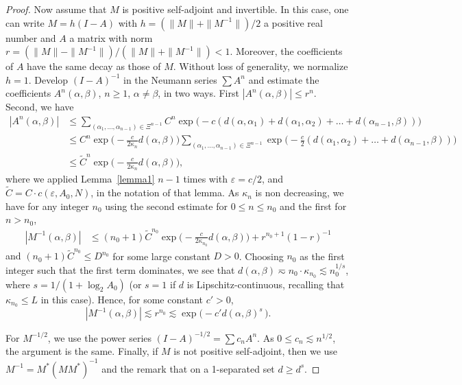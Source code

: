 \documentclass{amsart}
\numberwithin{equation}{section}
\theoremstyle{plain}
\theoremstyle{definition}
\theoremstyle{remark}
\begin{document}
{{\begin{proof}
Now assume that $M$ is {positive} self-adjoint and invertible. In this case, one can write $M=h(I-A)$ with $h=(\|M\| + \|M^{-1}\|)/2$ a positive real number and $A$ a matrix with norm $r=(\|M\|- \|M^{-1}\|)/(\|M\| + \|M^{-1}\|)<1$. Moreover, the coefficients of $A$ have the same decay as those of $M$. Without loss of generality, we normalize $h=1$.  Develop 
$
(I-A)^{-1}$ in the Neumann series $\sum A^n$ and estimate the coefficients $A^n(\alpha,\beta)$, $n\ge 1$, $\alpha\ne \beta$, in two ways. First 
$|A^n(\alpha,\beta)|\le r^n$. Second, we have {
\begin{equation*}
\begin{split}
  |A^n(\alpha,\beta)|
  &\leq \sum_{(\alpha_{1}, \ldots, \alpha_{n-1})\in \Xi^{n-1}} C^n \exp \big(-c (d(\alpha,\alpha_{1})+ d(\alpha_{1},\alpha_{2})+ \ldots +d(\alpha_{n-1},\beta))\big) \\ 
  &\leq C^n\exp\big(-\frac{c}{2\kappa_n}d(\alpha,\beta)\big)\sum_{(\alpha_{1}, \ldots, \alpha_{n-1})\in \Xi^{n-1}} 
   \exp \big(-\frac{c}{2} (d(\alpha_{1},\alpha_{2})+ \ldots +d(\alpha_{n-1},\beta))\big) \\
  &\leq \tilde{C}^n\exp\big(-\frac{c}{2\kappa_n}d(\alpha,\beta)\big),
\end{split}
\end{equation*}
where we applied Lemma~\ref{lemma1} $n-1$ times with $\varepsilon=c/2$, and $\tilde{C}=C\cdot c(\varepsilon,A_0,N)$, in the notation of that lemma.
 }
As $\kappa_{n}$ is non decreasing, we have for any  integer $n_{0}$ using the second estimate for $0\le n\le n_{0}$ and the first for $n>n_{0}$,
\begin{align*}
 |M^{-1}(\alpha,\beta)| &\le (n_{0}+1) \tilde C^{n_{0}} \exp\big(-\frac{c}{2\kappa_{n_{0}}} d(\alpha,\beta)\big) + r^{n_{0}+1} (1-r)^{-1} 
\end{align*}
{and $(n_{0}+1) \tilde C^{n_{0}}\leq D^{n_0}$} for some large constant $D>0$.
Choosing $n_{0}$ as the first integer such that the first term dominates, we see that $d(\alpha,\beta)\eqsim n_0\cdot\kappa_{n_0}\lesssim n_0^{1/s}$, where $s=1/(1+\log_2 A_0)$ (or $s=1$ if $d$ is Lipschitz-continuous, recalling that $\kappa_{n_0}\leq L$ in this case). Hence, for some constant $c'>0$, 
\begin{equation*}
  {|{M^{-1}(\alpha,\beta)}|}\lesssim r^{n_0}
  \lesssim\exp\big(-c' d(\alpha,\beta)^s\, \big).
\end{equation*}

For $M^{-1/2}$, we use the power series $ (I-A)^{-1/2}=\sum c_{n}A^{n}$.  As $0\le c_{n}\lesssim n^{1/2}$, the argument is the same. 
Finally, if $M$ is not {positive} self-adjoint, then we use $M^{-1}=M^*(MM^*)^{-1}$ and the remark that on a 1-separated set $d\ge d^s$. 
\end{proof}

}}
\end{document}
